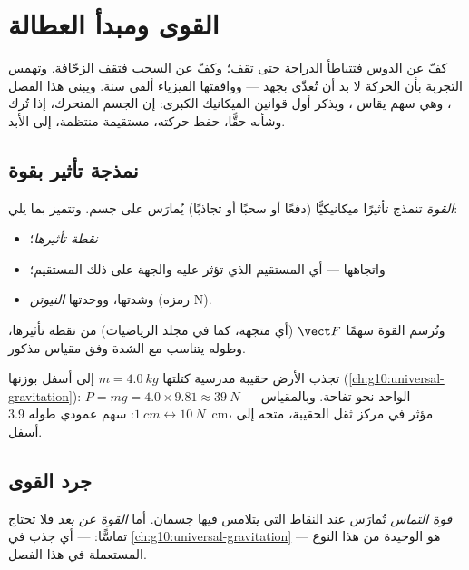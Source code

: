 \chapter{القوى ومبدأ العطالة}\label{ch:g10:inertia}

كفّ عن الدوس فتتباطأ الدراجة حتى تقف؛ وكفّ عن السحب فتقف
الزحّافة. وتهمس التجربة بأن الحركة لا بد أن تُغذّى
بجهد --- ووافقتها الفيزياء ألفي سنة. ويبني هذا الفصل
، وهي سهم يقاس ، ويذكر أول
قوانين الميكانيك الكبرى: إن الجسم المتحرك، إذا تُرك وشأنه حقًّا، حفظ
حركته، مستقيمة منتظمة، إلى الأبد.

\section{نمذجة تأثير بقوة}

\begin{definition}[القوة]\label{def:g10:inertia:force}
\emph{القوة} تنمذج تأثيرًا ميكانيكيًّا (دفعًا أو سحبًا
أو تجاذبًا) يُمارَس على جسم. وتتميز بما يلي:
\begin{itemize}
  \item \emph{نقطة تأثيرها}؛
  \item واتجاهها --- أي المستقيم الذي تؤثر عليه والجهة
        على ذلك المستقيم؛
  \item وشدتها، ووحدتها \emph{النيوتن}
        (رمزه \unit{N}).
\end{itemize}
وتُرسم القوة سهمًا $\vect F$ (أي متجهة، كما في مجلد
الرياضيات) من نقطة تأثيرها، وطوله يتناسب مع
الشدة وفق مقياس مذكور.
\end{definition}

\begin{example}\label{ex:g10:inertia:schoolbag}
تجذب الأرض حقيبة مدرسية كتلتها $m = \qty{4.0}{kg}$ إلى أسفل
بوزنها (\cref{ch:g10:universal-gravitation}):
$P = mg = 4.0 \times 9.81 \approx \qty{39}{N}$ ---  الواحد نحو
 تفاحة. وبالمقياس $\qty{1}{cm} \leftrightarrow
\qty{10}{N}$: سهم عمودي طوله \qty{3.9}{cm}، مؤثر في
مركز ثقل الحقيبة، متجه إلى أسفل.
\end{example}

\section{جرد القوى}

\begin{definition}\label{def:g10:inertia:contact}
\emph{قوة التماس} تُمارَس عند النقاط
التي يتلامس فيها جسمان. أما \emph{القوة عن بعد} فلا تحتاج تماسًّا:  --- أي جذب  في
\cref{ch:g10:universal-gravitation} --- هو  الوحيدة من هذا النوع المستعملة في هذا
الفصل.
\end{definition}

